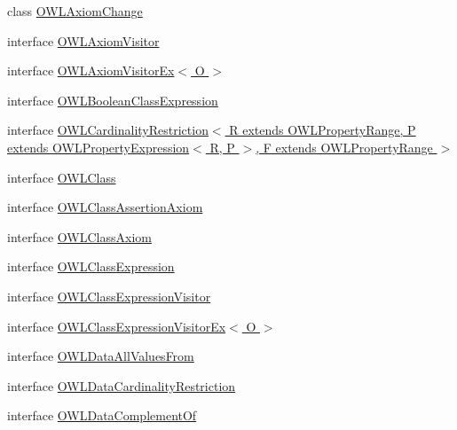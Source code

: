 \begin{DoxyCompactItemize}
\item 
class \hyperlink{classorg_1_1semanticweb_1_1owlapi_1_1model_1_1_o_w_l_axiom_change}{O\-W\-L\-Axiom\-Change}
\item 
interface \hyperlink{interfaceorg_1_1semanticweb_1_1owlapi_1_1model_1_1_o_w_l_axiom_visitor}{O\-W\-L\-Axiom\-Visitor}
\item 
interface \hyperlink{interfaceorg_1_1semanticweb_1_1owlapi_1_1model_1_1_o_w_l_axiom_visitor_ex_3_01_o_01_4}{O\-W\-L\-Axiom\-Visitor\-Ex$<$ O $>$}
\item 
interface \hyperlink{interfaceorg_1_1semanticweb_1_1owlapi_1_1model_1_1_o_w_l_boolean_class_expression}{O\-W\-L\-Boolean\-Class\-Expression}
\item 
interface \hyperlink{interfaceorg_1_1semanticweb_1_1owlapi_1_1model_1_1_o_w_l_cardinality_restriction_3_01_r_01extend3753e765e18fa3094a9c5d39619b7cfe}{O\-W\-L\-Cardinality\-Restriction$<$ R extends O\-W\-L\-Property\-Range, P extends O\-W\-L\-Property\-Expression$<$ R, P $>$, F extends O\-W\-L\-Property\-Range $>$}
\item 
interface \hyperlink{interfaceorg_1_1semanticweb_1_1owlapi_1_1model_1_1_o_w_l_class}{O\-W\-L\-Class}
\item 
interface \hyperlink{interfaceorg_1_1semanticweb_1_1owlapi_1_1model_1_1_o_w_l_class_assertion_axiom}{O\-W\-L\-Class\-Assertion\-Axiom}
\item 
interface \hyperlink{interfaceorg_1_1semanticweb_1_1owlapi_1_1model_1_1_o_w_l_class_axiom}{O\-W\-L\-Class\-Axiom}
\item 
interface \hyperlink{interfaceorg_1_1semanticweb_1_1owlapi_1_1model_1_1_o_w_l_class_expression}{O\-W\-L\-Class\-Expression}
\item 
interface \hyperlink{interfaceorg_1_1semanticweb_1_1owlapi_1_1model_1_1_o_w_l_class_expression_visitor}{O\-W\-L\-Class\-Expression\-Visitor}
\item 
interface \hyperlink{interfaceorg_1_1semanticweb_1_1owlapi_1_1model_1_1_o_w_l_class_expression_visitor_ex_3_01_o_01_4}{O\-W\-L\-Class\-Expression\-Visitor\-Ex$<$ O $>$}
\item 
interface \hyperlink{interfaceorg_1_1semanticweb_1_1owlapi_1_1model_1_1_o_w_l_data_all_values_from}{O\-W\-L\-Data\-All\-Values\-From}
\item 
interface \hyperlink{interfaceorg_1_1semanticweb_1_1owlapi_1_1model_1_1_o_w_l_data_cardinality_restriction}{O\-W\-L\-Data\-Cardinality\-Restriction}
\item 
interface \hyperlink{interfaceorg_1_1semanticweb_1_1owlapi_1_1model_1_1_o_w_l_data_complement_of}{O\-W\-L\-Data\-Complement\-Of}

\end{DoxyCompactItemize}
